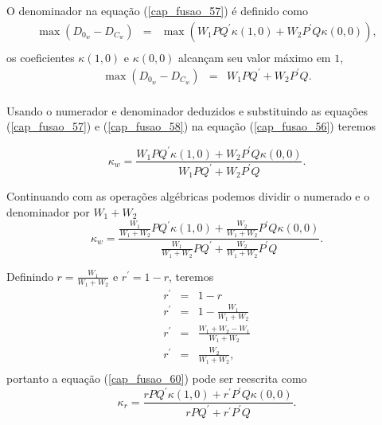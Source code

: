 O denominador na equação (\ref{cap_fusao_57}) é definido como 
\begin{equation}\nonumber
	\begin{array}{lll}
		\max(D_{0_w} - D_{C_w})&=&\max(W_1PQ^{'}\kappa(1,0) +W_2P^{'}Q\kappa(0,0)),\\
	\end{array}	
\end{equation}
os coeficientes $\kappa(1,0)$ e $\kappa(0,0)$ alcançam seu valor máximo em $1$, 
\begin{equation}\label{cap_fusao_58}
	\begin{array}{lll}
		\max(D_{0_w} - D_{C_w})&=&W_1PQ^{'} +W_2P^{'}Q.\\
	\end{array}	
\end{equation}

Usando o numerador e denominador deduzidos e substituindo as equações (\ref{cap_fusao_57}) e (\ref{cap_fusao_58}) na equação (\ref{cap_fusao_56}) teremos  

\begin{equation}\label{cap_fusao_59}
\kappa_w = \frac{W_1PQ^{'}\kappa(1,0) +W_2P^{'}Q\kappa(0,0)}{W_1PQ^{'} +W_2P^{'}Q}.
\end{equation}

Continuando com as operações algébricas podemos dividir o numerado e o denominador por $W_1 + W_2$
\begin{equation}\label{cap_fusao_60}
	\kappa_w = \frac{\frac{W_1}{W_1+W_2}PQ^{'}\kappa(1,0) +\frac{W_2}{W_1+W_2}P^{'}Q\kappa(0,0)}{\frac{W_1}{W_1+W_2}PQ^{'} +\frac{W_2}{W_1+W_2}P^{'}Q}.
\end{equation}

Definindo $r=\frac{W_1}{W_1+W_2}$ e $r^{'}=1-r$, teremos
\begin{equation}\nonumber
	\begin{array}{lll}
		r^{'}&=&1-r\\
		r^{'}&=&1-\frac{W_1}{W_1+W_2}\\
		r^{'}&=&\frac{W_1+W_2-W_1}{W_1+W_2}\\
		r^{'}&=&\frac{W_2}{W_1+W_2},\\
	\end{array}	
\end{equation}
portanto a equação (\ref{cap_fusao_60}) pode ser reescrita como
\begin{equation}\label{cap_fusao_61}
	\kappa_r = \frac{rPQ^{'}\kappa(1,0) +r^{'}P^{'}Q\kappa(0,0)}{rPQ^{'} +r^{'}P^{'}Q}.
\end{equation}

